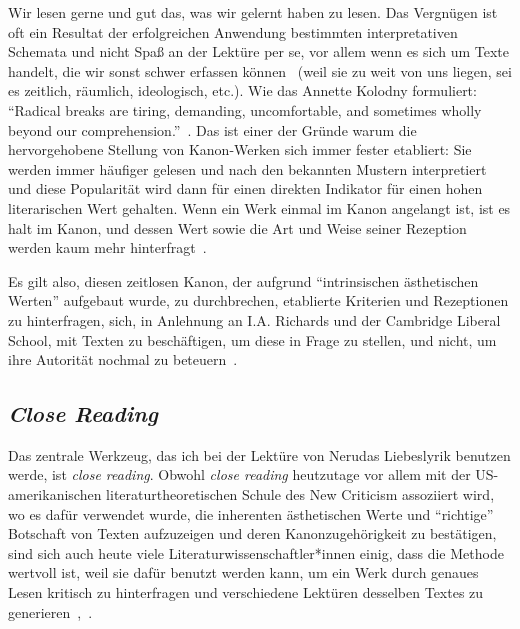 Wir lesen gerne und gut das, was wir gelernt haben zu lesen.
Das Vergnügen ist oft ein Resultat der erfolgreichen Anwendung bestimmten interpretativen Schemata und nicht Spaß an der Lektüre per se, vor allem wenn es sich um Texte handelt, die wir sonst schwer erfassen können~\cite{Kolodny1980} (weil sie zu weit von uns liegen, sei es zeitlich, räumlich, ideologisch, etc.).
Wie das Annette Kolodny formuliert:
``Radical breaks are tiring, demanding, uncomfortable, and sometimes wholly beyond our comprehension.''~\cite{Kolodny1980}.
Das ist einer der Gründe warum die hervorgehobene Stellung von Kanon-Werken sich immer fester etabliert:
Sie werden immer häufiger gelesen und nach den bekannten Mustern interpretiert und diese Popularität wird dann für einen direkten Indikator für einen hohen literarischen Wert gehalten.
Wenn ein Werk einmal im Kanon angelangt ist, ist es halt im Kanon, und dessen Wert sowie die Art und Weise seiner Rezeption werden kaum mehr hinterfragt~\cite{Kolodny1980}.

Es gilt also, diesen zeitlosen Kanon, der aufgrund ``intrinsischen ästhetischen Werten'' aufgebaut wurde, zu durchbrechen, etablierte Kriterien und Rezeptionen zu hinterfragen, %
sich, in Anlehnung an I.A. Richards und der Cambridge Liberal School, mit Texten zu beschäftigen, um diese in Frage zu stellen, und nicht, um ihre Autorität nochmal zu beteuern~\cite{North2013}.

\begin{comment}
Worüber geschrieben wird und welche Schrifte überliefert werden, prägt auch welche Themen als wichtig angesehen werden.
Was wiederum maßgeblich durch vorherrschende Machtverhältnisse geprägt wird.
\end{comment}


\subsection{\textit{Close Reading}}

Das zentrale Werkzeug, das ich bei der Lektüre von Nerudas Liebeslyrik benutzen werde, ist \textit{close reading}.
Obwohl \textit{close reading} heutzutage vor allem mit der US-amerikanischen literaturtheoretischen Schule des New Criticism assoziiert wird, wo es dafür verwendet wurde, die inherenten ästhetischen Werte und ``richtige'' Botschaft von Texten aufzuzeigen und deren Kanonzugehörigkeit zu bestätigen, sind sich auch heute viele Literaturwissenschaftler*innen einig, dass die Methode wertvoll ist, weil sie dafür benutzt werden kann, um ein Werk durch genaues Lesen kritisch zu hinterfragen und verschiedene Lektüren desselben Textes zu generieren~\cite{Gallop2007},~\cite{Beehler1988}.

